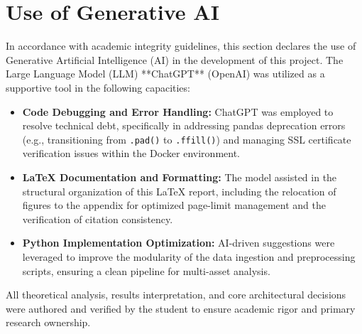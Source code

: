 \chapter{Use of Generative AI}
\label{app:ai_usage}

In accordance with academic integrity guidelines, this section declares the use of Generative Artificial Intelligence (AI) in the development of this project. The Large Language Model (LLM) **ChatGPT** (OpenAI) was utilized as a supportive tool in the following capacities:

\begin{itemize}
    \item \textbf{Code Debugging and Error Handling:} ChatGPT was employed to resolve technical debt, specifically in addressing pandas deprecation errors (e.g., transitioning from \texttt{.pad()} to \texttt{.ffill()}) and managing SSL certificate verification issues within the Docker environment.
    \item \textbf{LaTeX Documentation and Formatting:} The model assisted in the structural organization of this LaTeX report, including the relocation of figures to the appendix for optimized page-limit management and the verification of citation consistency.
    \item \textbf{Python Implementation Optimization:} AI-driven suggestions were leveraged to improve the modularity of the data ingestion and preprocessing scripts, ensuring a clean pipeline for multi-asset analysis.
\end{itemize}

All theoretical analysis, results interpretation, and core architectural decisions were authored and verified by the student to ensure academic rigor and primary research ownership.
